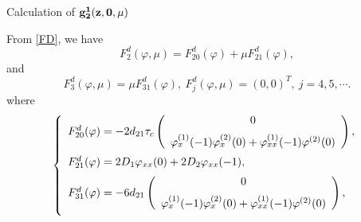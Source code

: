 \documentclass[11pt]{article}
\theoremstyle{definition}
\theoremstyle{remark}
\numberwithin{equation}{section}
\begin{document}
\vspace{0.2cm}
\begin{subsubsection}
{Calculation of $\bf{g_2^1(z,0,\mu)}$}
\end{subsubsection}

From \eqref{FD}, we have
\begin{equation}
\label{FD2MU}
F^d_2 (\varphi, \mu)=F^d_{20} (\varphi)+\mu F^d_{21} (\varphi) ,
\end{equation}
and
\begin{equation}
\label{FD3MU}
F^d_3 (\varphi, \mu)=\mu F^d_{31}(\varphi), ~F^d_j (\varphi, \mu)=(0, 0)^T,  ~j=4, 5, \cdots.
\end{equation}
where
\begin{equation}
\label{FD23}
\left\{
\begin{array}{l}
F^d_{20} (\varphi)=-2d_{21}\tau_c\left(\begin{array}{c}
0\vspace{0.2cm}\\
\varphi^{(1)}_{x}(-1)\varphi^{(2)}_{x}(0)+\varphi^{(1)}_{xx}(-1)\varphi^{(2)}(0) \end{array}\right),\vspace{0.2cm}\\
F^d_{21} (\varphi)=2D_1\varphi_{xx}(0)+2D_2\varphi_{xx}(-1),\vspace{0.2cm}\\
F^d_{31} (\varphi)=-6d_{21}\left(\begin{array}{c}
0\vspace{0.2cm}\\
\varphi^{(1)}_{x}(-1)\varphi^{(2)}_{x}(0)+\varphi^{(1)}_{xx}(-1)\varphi^{(2)}(0)\end{array}\right),   \vspace{0.2cm}\\
\end{array}
\right.
\end{equation}
\end{document}

